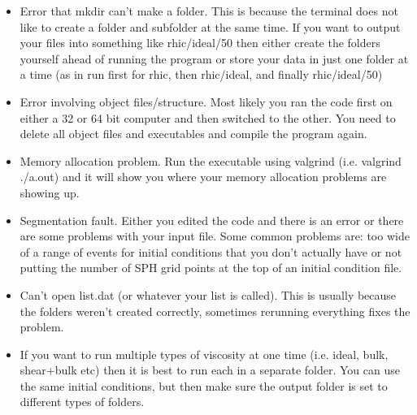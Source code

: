 \documentclass[article]{revtex4-1}
\begin{document}
\begin{itemize}
\item Error that mkdir can't make a folder.  This is because the terminal does not like to create a folder and subfolder at the same time.  If you want to output your files into something like rhic/ideal/50 then either create the folders yourself ahead of running the program or store your data in just one folder at a time (as in run first for rhic, then rhic/ideal, and finally rhic/ideal/50)
\item Error involving object files/structure.  Most likely you ran the code first on either a 32 or 64 bit computer and then switched to the other.  You need to delete all object files and executables and compile the program again.
\item Memory allocation problem.  Run the executable using valgrind (i.e. valgrind ./a.out) and it will show you where your memory allocation problems are showing up.  
\item Segmentation fault.  Either you edited the code and there is an error or there are some problems with your input file.  Some common problems are: too wide of a range of events for initial conditions that you don't actually have or not putting the number of SPH grid points at the top of an initial condition file.
\item Can't open list.dat (or whatever your list is called). This is usually because the folders weren't created correctly, sometimes rerunning everything fixes the problem.
\item If you want to run multiple types of viscosity at one time (i.e. ideal, bulk, shear+bulk etc) then it is best to run each in a separate folder.  You can use the same initial conditions, but then make sure the output folder is set to different types of folders.
\end{itemize}



\clearpage
\newpage
\end{document}
